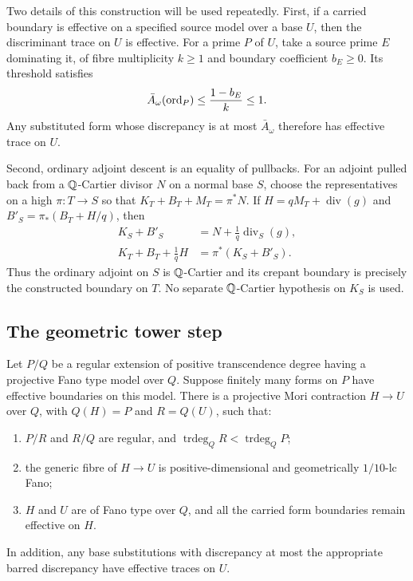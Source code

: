 Two details of this construction will be used repeatedly.
First, if a carried boundary is effective on a specified source
model over a base $U$, then the discriminant trace on $U$ is
effective.  For a prime $P$ of $U$, take a source prime $E$
dominating it, of fibre multiplicity $k\ge1$ and boundary
coefficient $b_E\ge0$.  Its threshold satisfies
\begin{equation}
\label{tower:effective-base-trace}
 \bar A_\omega(\operatorname{ord}_P)\le\frac{1-b_E}{k}\le1.
\end{equation}
Any substituted form whose discrepancy is at most
$\bar A_\omega$ therefore has effective trace on $U$.

Second, ordinary adjoint descent is an equality of pullbacks.
For an adjoint pulled back from a $\mathbb Q$-Cartier divisor $N$ on
a normal base $S$, choose the representatives on a high
$\pi:T\to S$ so that
$K_T+B_T+M_T=\pi^*N$.
If $H=qM_T+\operatorname{div}(g)$ and
$B'_S=\pi_*(B_T+H/q)$, then
\begin{equation}
\label{tower:ordinary-adjoint-descent}
 \begin{split}
 K_S+B'_S&=N+\tfrac1q\operatorname{div}_S(g),\\
 K_T+B_T+\tfrac1qH&=\pi^*(K_S+B'_S).
 \end{split}
\end{equation}
Thus the ordinary adjoint on $S$ is $\mathbb Q$-Cartier and its crepant
boundary is precisely the constructed boundary on $T$.
No separate $\mathbb Q$-Cartier hypothesis on $K_S$ is used.

\subsection{The geometric tower step}

\begin{lemma}
\label{tower:geometric-step}
Let $P/Q$ be a regular extension of positive transcendence degree
having a projective Fano type model over $Q$.
Suppose finitely many forms on $P$ have effective boundaries on
this model.  There is a projective Mori contraction $H\to U$
over $Q$, with $Q(H)=P$ and $R=Q(U)$, such that:
\begin{enumerate}[label=\textup{(\roman*)}]
\item $P/R$ and $R/Q$ are regular, and
$\operatorname{trdeg}_Q R<\operatorname{trdeg}_Q P$;
\item the generic fibre of $H\to U$ is positive-dimensional
and geometrically $1/10$-lc Fano;
\item $H$ and $U$ are of Fano type over $Q$, and all the carried
form boundaries remain effective on $H$.
\end{enumerate}
In addition, any base substitutions with discrepancy at most the
appropriate barred discrepancy have effective traces on $U$.
\end{lemma}

